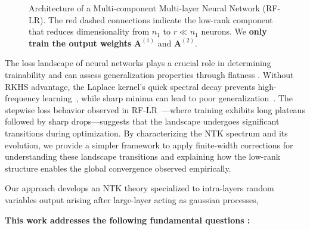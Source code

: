 \begin{figure}[htbp]
    \caption{Architecture of a Multi-component Multi-layer Neural Network (RF-LR). The red dashed connections indicate the low-rank component that reduces dimensionality from $n_1$ to $r \ll n_1$ neurons.
    We \textbf{only train the output weights} $\bm{A}^{(1)}$ and $\bm{A}^{(2)}$.}
    \label{fig:RF-LR_architecture}
\end{figure}




The loss landscape of neural networks plays a crucial role in determining trainability and can assess generalization properties through flatness \cite{li2025seekingconsistentflatminima}. 
Without RKHS advantage, the Laplace kernel's quick spectral decay prevents high-frequency 
learning~\cite{jacot2018neural,cao2020understandingspectralbiasdeep}, while sharp minima can lead to poor
 generalization~\cite{li2018visualizing,fort2019large}. The stepwise loss behavior observed in
  RF-LR~\cite{zhang2025structuredbalancedmulticomponentmultilayer}—where training exhibits long plateaus followed by 
  sharp drops—suggests that the landscape undergoes significant transitions during optimization. By characterizing the NTK 
  spectrum and its evolution, we provide a simpler framework to apply finite-width corrections for understanding these landscape 
  transitions and explaining how the low-rank structure enables the global convergence observed empirically.



  Our approach develops an NTK theory specialized to intra-layers random variables output arising after large-layer acting as gaussian processes, 



\vspace{1em}

\noindent
\textbf{This work addresses the following fundamental questions :}

\vspace{0.3em}

